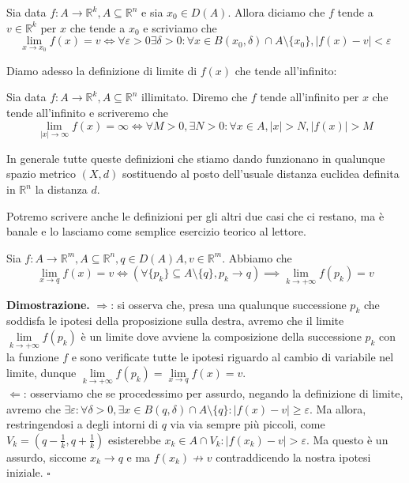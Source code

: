 \begin{definition}[\textcolor{blue}{definizione di limite}]
Sia data $f: A \to \mathbb{R}^k, A \subseteq \mathbb{R}^n$ e sia $x_0 \in D(A)$. Allora diciamo che $f$ tende a $v \in \mathbb{R}^k$ per $x$ che tende a $x_0$ e scriviamo che
$$
\lim_{x \to x_0} f(x) = v \iff \forall \varepsilon > 0 \exists \delta > 0 : \forall x \in B(x_0, \delta) \cap A \setminus \{ x_0 \}, |f(x) - v| < \varepsilon
$$
\end{definition}

\vspace{0.5cm}
\noindent Diamo adesso la definizione di limite di $f(x)$ che tende all'infinito:

\begin{definition}[\textcolor{blue}{limite che tende all'infinito}]
Sia data $f: A \to \mathbb{R}^k, A \subseteq \mathbb{R}^n$ illimitato. Diremo che $f$ tende all'infinito per $x$ che tende all'infinito e scriveremo che
$$
\lim_{|x| \to \infty} f(x) = \infty \iff \forall M > 0, \exists N > 0: \forall x \in A, |x| > N, |f(x)| > M
$$
\end{definition}

\begin{remark}
In generale tutte queste definizioni che stiamo dando funzionano in qualunque spazio metrico $(X,d)$ sostituendo al posto dell'usuale distanza euclidea definita in $\mathbb{R}^n$ la distanza $d$.
\end{remark}

\noindent Potremo scrivere anche le definizioni per gli altri due casi che ci restano, ma è banale e lo lasciamo come semplice esercizio teorico al lettore. \\

\begin{theorem}[\textcolor{blue}{caratterizzazione del limite per successioni}]
Sia $f: A \to \mathbb{R}^m, A \subseteq \mathbb{R}^n, q \in D(A) A, v \in \mathbb{R}^m$. Abbiamo che
$$
\lim_{x \to q} f(x) = v \iff (\forall \{ p_k \} \subseteq A \setminus \{ q \}, p_k \to q) \implies \lim_{k \to +\infty} f(p_k) = v
$$
\end{theorem}

\noindent \textbf{Dimostrazione. }
$\boxed{\Rightarrow}$: si osserva che, presa una qualunque successione $p_k$ che soddisfa le ipotesi della proposizione sulla destra, avremo che il limite $\lim\limits_{k \to +\infty} f(p_k)$ è un limite dove avviene la composizione della successione $p_k$ con la funzione $f$ e sono verificate tutte le ipotesi riguardo al cambio di variabile nel limite, dunque $\lim\limits_{k \to +\infty} f(p_k) = \lim\limits_{x \to q} f(x) = v$. \\
$\boxed{\Leftarrow}$: osserviamo che se procedessimo per assurdo, negando la definizione di limite, avremo che $\exists \varepsilon: \forall \delta > 0, \exists x \in B(q, \delta) \cap A \setminus \{ q \}: |f(x) - v| \geq \varepsilon$. Ma allora, restringendosi a degli intorni di $q$ via via sempre più piccoli, come $V_k = (q-\frac{1}{k}, q + \frac{1}{k})$ esisterebbe $x_k \in A \cap V_k : |f(x_k) - v| > \varepsilon$. Ma questo è un assurdo, siccome $x_k \to q$ e ma $f(x_k) \not\to v$ contraddicendo la nostra ipotesi iniziale.
\hfill $\square$

